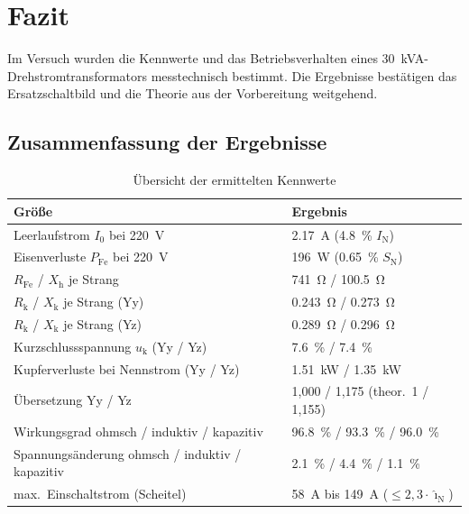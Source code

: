 \documentclass[a4paper,11pt]{scrreprt}
\begin{document}
\chapter{Fazit}

Im Versuch wurden die Kennwerte und das Betriebsverhalten eines \SI{30}{kVA}-Drehstromtransformators messtechnisch bestimmt. Die Ergebnisse bestätigen das Ersatzschaltbild und die Theorie aus der Vorbereitung weitgehend.

\section{Zusammenfassung der Ergebnisse}

\begin{table}[H]
\centering
\caption{Übersicht der ermittelten Kennwerte}
\label{tab:fazit}
\begin{tabular}{@{}ll@{}}
\toprule
Größe & Ergebnis\\
\midrule
Leerlaufstrom $I_0$ bei \SI{220}{V} & \SI{2.17}{A} (\SI{4.8}{\percent} $I_\mathrm{N}$)\\
Eisenverluste $P_\mathrm{Fe}$ bei \SI{220}{V} & \SI{196}{W} (\SI{0.65}{\percent} $S_\mathrm{N}$)\\
$R_\mathrm{Fe}$ / $X_\mathrm{h}$ je Strang & \SI{741}{\ohm} / \SI{100.5}{\ohm}\\
$R_\mathrm{k}$ / $X_\mathrm{k}$ je Strang (Yy) & \SI{0.243}{\ohm} / \SI{0.273}{\ohm}\\
$R_\mathrm{k}$ / $X_\mathrm{k}$ je Strang (Yz) & \SI{0.289}{\ohm} / \SI{0.296}{\ohm}\\
Kurzschlussspannung $u_\mathrm{k}$ (Yy / Yz) & \SI{7.6}{\percent} / \SI{7.4}{\percent}\\
Kupferverluste bei Nennstrom (Yy / Yz) & \SI{1.51}{kW} / \SI{1.35}{kW}\\
Übersetzung Yy / Yz & 1,000 / 1,175 (theor.\ 1 / 1,155)\\
Wirkungsgrad ohmsch / induktiv / kapazitiv & \SI{96.8}{\percent} / \SI{93.3}{\percent} / \SI{96.0}{\percent}\\
Spannungsänderung ohmsch / induktiv / kapazitiv & \SI{2.1}{\percent} / \SI{4.4}{\percent} / \SI{1.1}{\percent}\\
max.\ Einschaltstrom (Scheitel) & \SI{58}{A} bis \SI{149}{A} ($\le 2{,}3\cdot\hat\imath_\mathrm{N}$)\\
\bottomrule
\end{tabular}
\end{table}
\end{document}
